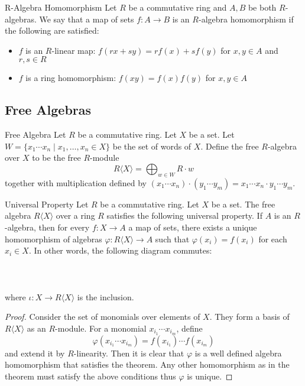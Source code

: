 \documentclass[a4paper]{article}
\begin{document}
\begin{defn}{R-Algebra Homomorphism}{} Let $R$ be a commutative ring and $A,B$ be both $R$-algebras. We say that a map of sets $f:A\to B$ is an $R$-algebra homomorphism if the following are satisfied: 
\begin{itemize}
\item $f$ is an $R$-linear map: $f(rx+sy)=rf(x)+sf(y)$ for $x,y\in A$ and $r,s\in R$
\item $f$ is a ring homomorphism: $f(xy)=f(x)f(y)$ for $x,y\in A$
\end{itemize}
\end{defn}

\subsection{Free Algebras}
\begin{defn}{Free Algebra}{} Let $R$ be a commutative ring. Let $X$ be a set. Let $W=\{x_1\cdots x_n\;|\;x_1,\dots,x_n\in X\}$ be the set of words of $X$. Define the free $R$-algebra over $X$ to be the free $R$-module $$R\langle X\rangle=\bigoplus_{w\in W}R\cdot w$$ together with multiplication defined by $(x_1\cdots x_n)\cdot(y_1\cdots y_m)=x_1\cdots x_n\cdot y_1\cdots y_m$. 
\end{defn}

\begin{prp}{Universal Property}{} Let $R$ be a commutative ring. Let $X$ be a set. The free algebra $R\langle X\rangle$ over a ring $R$ satisfies the following universal property. If $A$ is an $R$-algebra, then for every $f:X\to A$ a map of sets, there exists a unique homomorphism of algebras $\varphi:R\langle X\rangle\to A$ such that $\varphi(x_i)=f(x_i)$ for each $x_i\in X$. In other words, the following diagram commutes: \\~\\
\\~\\
where $\iota:X\to R\langle X\rangle$ is the inclusion. 
\begin{proof}
Consider the set of monomials over elements of $X$. They form a basis of $R\langle X\rangle$ as an $R$-module. For a monomial $x_{i_1}\cdots x_{i_m}$, define $$\varphi(x_{i_1}\cdots x_{i_m})=f(x_{i_1})\cdots f(x_{i_m})$$ and extend it by $R$-linearity. Then it is clear that $\varphi$ is a well defined algebra homomorphism that satisfies the theorem. Any other homomorphism as in the theorem must satisfy the above conditions thus $\varphi$ is unique. 
\end{proof}
\end{prp}
\end{document}
